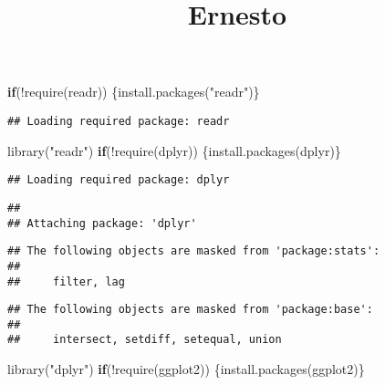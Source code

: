 \documentclass[
]{article}
\title{Ernesto}
\author{}
\date{\vspace{-2.5em}}
\newenvironment{Shaded}{\begin{snugshade}}{\end{snugshade}}
\newcommand{\ControlFlowTok}[1]{\textcolor[rgb]{0.13,0.29,0.53}{\textbf{#1}}}
\newcommand{\FunctionTok}[1]{\textcolor[rgb]{0.00,0.00,0.00}{#1}}
\newcommand{\NormalTok}[1]{#1}
\newcommand{\SpecialCharTok}[1]{\textcolor[rgb]{0.00,0.00,0.00}{#1}}
\newcommand{\StringTok}[1]{\textcolor[rgb]{0.31,0.60,0.02}{#1}}
\begin{document}
\maketitle

\begin{Shaded}
\begin{Highlighting}[]
\ControlFlowTok{if}\NormalTok{(}\SpecialCharTok{!}\FunctionTok{require}\NormalTok{(readr)) \{}\FunctionTok{install.packages}\NormalTok{(}\StringTok{"readr"}\NormalTok{)\}}
\end{Highlighting}
\end{Shaded}

\begin{verbatim}
## Loading required package: readr
\end{verbatim}

\begin{Shaded}
\begin{Highlighting}[]
\FunctionTok{library}\NormalTok{(}\StringTok{"readr"}\NormalTok{)}
\ControlFlowTok{if}\NormalTok{(}\SpecialCharTok{!}\FunctionTok{require}\NormalTok{(dplyr)) \{}\FunctionTok{install.packages}\NormalTok{(}\StringTok{\textquotesingle{}dplyr\textquotesingle{}}\NormalTok{)\}}
\end{Highlighting}
\end{Shaded}

\begin{verbatim}
## Loading required package: dplyr
\end{verbatim}

\begin{verbatim}
## 
## Attaching package: 'dplyr'
\end{verbatim}

\begin{verbatim}
## The following objects are masked from 'package:stats':
## 
##     filter, lag
\end{verbatim}

\begin{verbatim}
## The following objects are masked from 'package:base':
## 
##     intersect, setdiff, setequal, union
\end{verbatim}

\begin{Shaded}
\begin{Highlighting}[]
\FunctionTok{library}\NormalTok{(}\StringTok{"dplyr"}\NormalTok{)}
\ControlFlowTok{if}\NormalTok{(}\SpecialCharTok{!}\FunctionTok{require}\NormalTok{(ggplot2)) \{}\FunctionTok{install.packages}\NormalTok{(}\StringTok{\textquotesingle{}ggplot2\textquotesingle{}}\NormalTok{)\}}
\end{Highlighting}
\end{Shaded}
\end{document}
